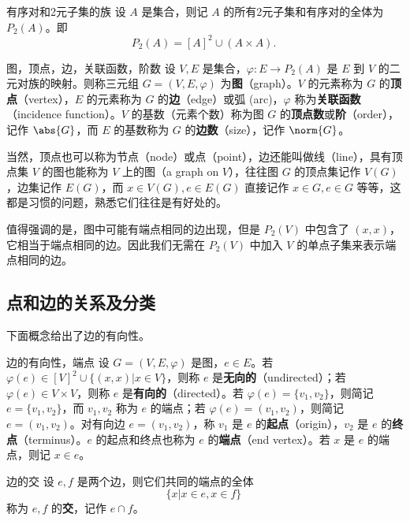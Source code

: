 \begin{definition}{有序对和2元子集的族}
设 $A$ 是集合，则记 $A$ 的所有2元子集和有序对的全体为 $P_2(A)$。即
\begin{equation}
P_2(A)=[A]^2\cup (A\times A).~
\end{equation}

\end{definition}


\begin{definition}{图，顶点，边，关联函数，阶数}
设 $V,E$ 是集合，$\varphi:E\rightarrow P_2(A)$ 是 $E$ 到 $V$ 的二元对族的映射。则称三元组 $G=(V,E,\varphi)$ 为\textbf{图}（graph）。$V$ 的元素称为 $G$ 的\textbf{顶点}（vertex），$E$ 的元素称为 $G$ 的\textbf{边}（edge）或弧 (arc)，$\varphi$ 称为\textbf{关联函数}（incidence function）。$V$ 的基数（元素个数）称为图 $G$ 的\textbf{顶点数}或\textbf{阶}（order），记作 $\abs{G}$，而 $E$ 的基数称为 $G$ 的\textbf{边数}（size），记作 $\norm{G}$。
\end{definition}


当然，顶点也可以称为节点（node）或点（point），边还能叫做线（line），具有顶点集 $V$ 的图也能称为 $V$ 上的图（a graph on $V$），往往图 $G$ 的顶点集记作 $V(G)$，边集记作 $E(G)$，而 $x\in V(G),e\in E(G)$ 直接记作 $x\in G,e\in G$ 等等，这都是习惯的问题，熟悉它们往往是有好处的。

值得强调的是，图中可能有端点相同的边出现，但是 $P_2(V)$ 中包含了 $(x,x)$，它相当于端点相同的边。因此我们无需在 $P_2(V)$ 中加入 $V$ 的单点子集来表示端点相同的边。

\subsection{点和边的关系及分类}


下面概念给出了边的有向性。
\begin{definition}{边的有向性，端点}
设 $G=(V,E,\varphi)$ 是图，$e\in E$。若 $\varphi(e)\in[V]^2\cup\{(x,x)|x\in V\}$，则称 $e$ 是\textbf{无向的}（undirected）；若 $\varphi(e)\in V\times V$，则称 $e$ 是\textbf{有向的}（directed）。若 $\varphi(e)=\{v_1,v_2\}$，则简记 $e=\{v_1,v_2\}$，而 $v_1,v_2$ 称为 $e$ 的端点；若 $\varphi(e)=(v_1,v_2)$，则简记 $e=(v_1,v_2)$。对有向边 $e=(v_1,v_2)$，称 $v_1$ 是 $e$ 的\textbf{起点}（origin），$v_2$ 是 $e$ 的\textbf{终点}（terminus）。$e$ 的起点和终点也称为 $e$ 的\textbf{端点}（end vertex）。若 $x$ 是 $e$ 的端点，则记 $x\in e$。
\end{definition}


\begin{definition}{边的交}
设 $e,f$ 是两个边，则它们共同的端点的全体
\begin{equation}
\{x|x\in e,x\in f\}~
\end{equation}
称为 $e,f$ 的\textbf{交}，记作 $e\cap f$。
\end{definition}

